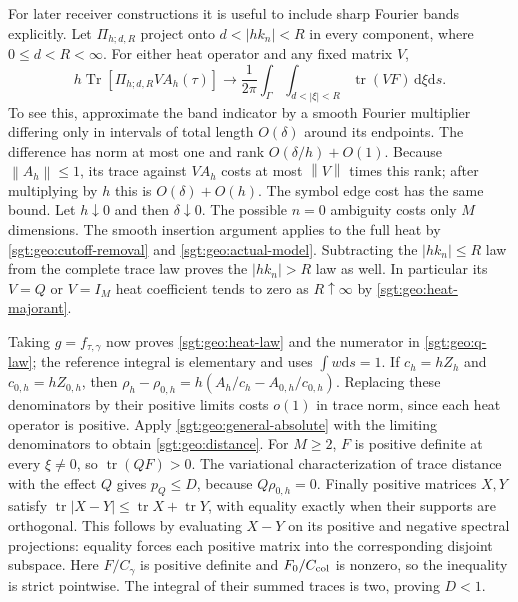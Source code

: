 \documentclass[aps,pra,reprint,superscriptaddress,longbibliography]{revtex4-2}
\newcommand{\Tr}{\operatorname{Tr}}
\newcommand{\dd}{\mathrm d}
\newcommand{\norm}[1]{\left\lVert#1\right\rVert}
\begin{document}
For later receiver constructions it is useful to include sharp
Fourier bands explicitly.  Let $\Pi_{h;d,R}$ project onto
$d<|hk_n|<R$ in every component, where $0\leq d<R<\infty$.
For either heat operator and any fixed matrix $V$,
\begin{equation}
 h\Tr[\Pi_{h;d,R}V A_h(\tau)]
 \longrightarrow\frac1{2\pi}\int_\Gamma
            \int_{d<|\xi|<R}\operatorname{tr}(VF)\,\dd\xi\dd s.
 \label{sgt:geo:band-law}
\end{equation}
To see this, approximate the band indicator by a smooth Fourier
multiplier differing only in intervals of total length $O(\delta)$
around its endpoints.  The difference has norm at most one and rank
$O(\delta/h)+O(1)$.  Because $\norm{A_h}\leq1$, its trace against
$VA_h$ costs at most $\norm{V}$ times this rank; after multiplying by
$h$ this is $O(\delta)+O(h)$.  The symbol edge cost has the same bound.
Let $h\downarrow0$ and then $\delta\downarrow0$.  The possible
$n=0$ ambiguity costs only $M$ dimensions.  The smooth insertion
argument applies to the full heat by \eqref{sgt:geo:cutoff-removal}
and \eqref{sgt:geo:actual-model}.  Subtracting the $|hk_n|\leq R$ law
from the complete trace law proves the $|hk_n|>R$ law as well.
In particular its $V=Q$ or $V=I_M$ heat coefficient tends to zero as
$R\uparrow\infty$ by \eqref{sgt:geo:heat-majorant}.

Taking $g=f_{\tau,\gamma}$ now proves \eqref{sgt:geo:heat-law} and
the numerator in \eqref{sgt:geo:q-law}; the reference integral is
elementary and uses $\int w\dd s=1$.  If $c_h=hZ_h$ and $c_{0,h}=hZ_{0,h}$,
then
$\rho_h-\rho_{0,h}=h(A_h/c_h-A_{0,h}/c_{0,h})$.
Replacing these denominators by their positive limits costs $o(1)$
in trace norm, since each heat operator is positive.  Apply
\eqref{sgt:geo:general-absolute} with the limiting denominators to
obtain \eqref{sgt:geo:distance}.
For $M\geq2$, $F$ is positive definite at every $\xi\ne0$, so
$\operatorname{tr}(QF)>0$.  The variational characterization of trace
distance with the effect $Q$ gives $p_Q\leq D$, because
$Q\rho_{0,h}=0$.  Finally positive matrices $X,Y$ satisfy
$\operatorname{tr}|X-Y|\leq\operatorname{tr}X+\operatorname{tr}Y$,
with equality exactly when their supports are orthogonal.  This follows
by evaluating $X-Y$ on its positive and negative spectral projections:
equality forces each positive matrix into the corresponding disjoint
subspace.  Here $F/C_\gamma$ is positive definite and $F_0/C_{\rm col}$
is nonzero, so the inequality is strict pointwise.  The integral of
their summed traces is two, proving $D<1$.
\end{document}

